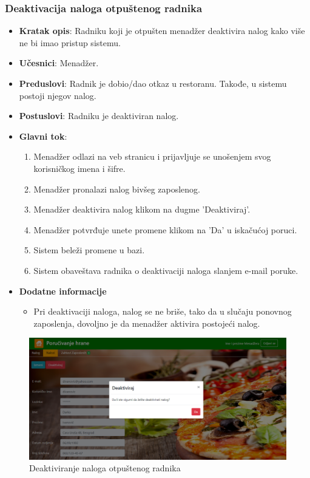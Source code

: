 \newpage
 \subsubsection{Deaktivacija naloga otpuštenog radnika}
 
 \begin{itemize}
    \item \textbf{Kratak opis}:
   Radniku koji je otpušten menadžer deaktivira nalog kako više ne bi imao pristup sistemu.
    \item \textbf{Učesnici}:
    Menadžer.
    \item \textbf{Preduslovi}:
    Radnik je dobio/dao otkaz u restoranu. Takođe, u sistemu postoji njegov nalog.
    \item \textbf{Postuslovi}:
    Radniku je deaktiviran nalog. 
    \item \textbf{Glavni tok}:
    \begin{enumerate}
        \item Menadžer odlazi na veb stranicu i prijavljuje se unošenjem svog korisničkog imena i šifre.
        \item Menadžer pronalazi nalog bivšeg zaposlenog.
        \item Menadžer deaktivira nalog klikom na dugme 'Deaktiviraj'.
        \item Menadžer potvrđuje unete promene klikom na  'Da' u iskačućoj poruci.
        \item Sistem beleži promene u bazi.
        \item Sistem obaveštava radnika o deaktivaciji naloga slanjem e-mail poruke.
    \end{enumerate}
\item \textbf{Dodatne informacije}
 \begin{itemize}
     \item Pri deaktivaciji naloga, nalog se ne briše, tako da u slučaju ponovnog zaposlenja, dovoljno je da menadžer aktivira postojeći nalog.
 \end{itemize}
 \end{itemize}
 
 
 \begin{figure}[!h]
    \includegraphics[width=1\textwidth]{slike/menadzer_deaktiviranje.PNG}
    \caption{Deaktiviranje naloga otpuštenog radnika} %
    \label{fig:slika_deaktiviranje}
\end{figure}
 \newpage
